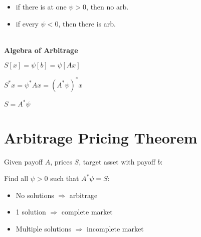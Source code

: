 \begin{itemize}
    \item if there is at one $\psi >0$, then no arb.
    \item if every $\psi <0$, then there is arb.
\end{itemize}

 \\

\textbf{Algebra of Arbitrage}

$S[x] = \psi[b] = \psi[Ax]$

$S^* x = \psi^* Ax = (A^* \psi)^* x$

$S = A^* \psi$

\section{Arbitrage Pricing Theorem}

Given payoff $A$, prices $S$, target asset with payoff $b$:

Find all $\psi >0$ such that $A^* \psi = S$:
\begin{itemize}
    \item No solutions $\Rightarrow$ arbitrage
    \item 1 solution $\Rightarrow$ complete market
    \item Multiple solutions $\Rightarrow$ incomplete market
\end{itemize}